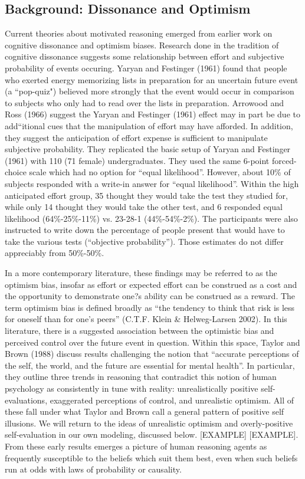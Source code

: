 \documentclass{article}
\begin{document}
\subsection{Background: Dissonance and Optimism}
Current theories about motivated reasoning emerged from earlier work on cognitive dissonance and optimism biases. Research done in the tradition of cognitive dissonance suggests some relationship between effort and subjective probability of events occuring. Yaryan and Festinger (1961) found that people who exerted energy memorizing lists in preparation for an uncertain future event (a ``pop-quiz") believed more strongly that the event would occur in comparison to subjects who only had to read over the lists in preparation. Arrowood and Ross (1966) suggest the Yaryan and Festinger (1961) effect may in part be due to add``itional cues that the manipulation of effort may have afforded. In addition, they suggest the anticipation of effort expense is sufficient to manipulate subjective probability. They replicated the basic setup of Yaryan and Festinger (1961) with 110 (71 female) undergraduates. They used the same 6-point forced-choice scale which had no option for ``equal likelihood''. However, about 10\% of subjects responded with a write-in answer for ``equal likelihood''. Within the high anticipated effort group, 35 thought they would take the test they studied for, while only 14 thought they would take the other test, and 6 responded equal likelihood (64\%-25\%-11\%) vs. 23-28-1 (44\%-54\%-2\%). The participants were also instructed to write down the percentage of people present that would have to take the various tests (``objective probability''). Those estimates do not differ appreciably from 50\%-50\%. 

In a more contemporary literature, these findings may be referred to as the optimism bias, insofar as effort or expected effort can be construed as a cost and the opportunity to demonstrate one?s ability can be construed as a reward. The term optimism bias is defined broadly as ``the tendency to think that risk is less for oneself than for one's peers'' (C.T.F. Klein \& Helweg-Larsen 2002). In this literature, there is a suggested association between the optimistic bias and perceived control over the future event in question. Within this space, Taylor and Brown (1988) discuss results challenging the notion that ``accurate perceptions of the self, the world, and the future are essential for mental health''. In particular, they outline three trends in reasoning that contradict this notion of human psychology as consistently in tune with reality: unrealistically positive self-evaluations, exaggerated perceptions of control, and unrealistic optimism. All of these fall under what Taylor and Brown call a general pattern of positive self illusions. We will return to the ideas of unrealistic optimism and overly-positive self-evaluation in our own modeling, discussed below. [EXAMPLE] [EXAMPLE]. From these early results emerges a picture of human reasoning agents as frequently susceptible to the beliefs which suit them best, even when such beliefs run at odds with laws of probability or causality. 
\end{document}
